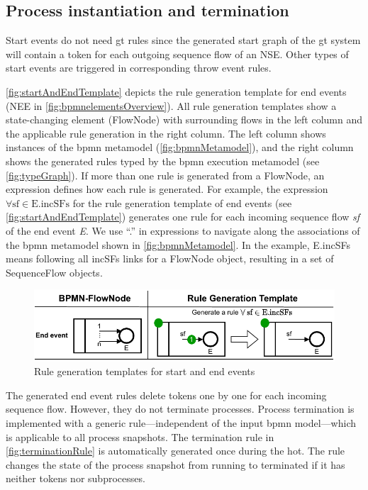 \documentclass[runningheads]{llncs}
\begin{document}
\subsection{Process instantiation and termination} \label{subsec:instAndTermination}

Start events do not need \gls*{gt} rules since the generated start graph of the \gls*{gt} system will contain a token for each outgoing sequence flow of an NSE.
Other types of start events are triggered in corresponding throw event rules.

\autoref{fig:startAndEndTemplate} depicts the rule generation template for end events (\textsf{NEE} in \autoref{fig:bpmnelementsOverview}).
All rule generation templates show a state-changing element (\textsf{FlowNode}) with surrounding flows in the left column and the applicable rule generation in the right column.
The left column shows instances of the \gls*{bpmn} metamodel (\autoref{fig:bpmnMetamodel}), and the right column shows the generated rules typed by the \gls*{bpmn} execution metamodel (see \autoref{fig:typeGraph}).
If more than one rule is generated from a \textsf{FlowNode}, an expression defines how each rule is generated.
For example, the expression $\forall \text{sf} \in \text{E.incSFs}$ for the rule generation template of end events (see \autoref{fig:startAndEndTemplate}) generates one rule for each incoming sequence flow \textit{sf} of the end event \textit{E}.
We use ``.'' in expressions to navigate along the associations of the \gls*{bpmn} metamodel shown in \autoref{fig:bpmnMetamodel}.
In the example, \textsf{E.incSFs} means following all \textsf{incSFs} links for a \textsf{FlowNode} object, resulting in a set of \textsf{SequenceFlow} objects.

\begin{figure}[ht]
    \centering
    \includegraphics[width=1\textwidth]{images/end_template.pdf}
    \caption{Rule generation templates for start and end events}
    \label{fig:startAndEndTemplate}
\end{figure}
    
The generated end event rules delete tokens one by one for each incoming sequence flow.
However, they do not terminate processes.
Process termination is implemented with a generic rule---independent of the input \gls*{bpmn} model---which is applicable to all process snapshots.
The termination rule in \autoref{fig:terminationRule} is automatically generated once during the \gls*{hot}.
The rule changes the state of the process snapshot from running to terminated if it has neither tokens nor subprocesses.
\end{document}
